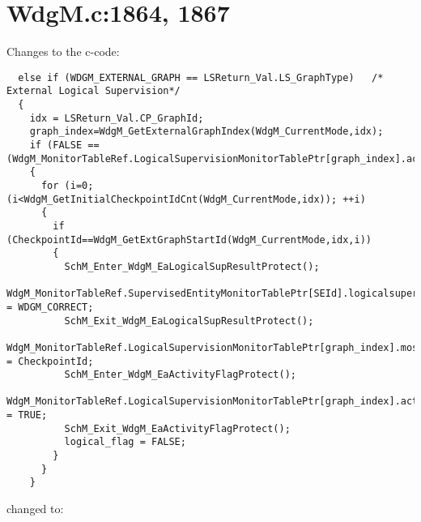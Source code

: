 \documentclass[11pt,a4paper]{article}
\begin{document}
\section{WdgM.c:1864, 1867}
\lstset{language=autosar}

\lstset{language=c}

Changes to the c-code:
\begin{lstlisting}
  else if (WDGM_EXTERNAL_GRAPH == LSReturn_Val.LS_GraphType)   /* External Logical Supervision*/
  {
    idx = LSReturn_Val.CP_GraphId;
    graph_index=WdgM_GetExternalGraphIndex(WdgM_CurrentMode,idx);
    if (FALSE == (WdgM_MonitorTableRef.LogicalSupervisionMonitorTablePtr[graph_index].activity_flag))
    {
      for (i=0; (i<WdgM_GetInitialCheckpointIdCnt(WdgM_CurrentMode,idx)); ++i)
      {
        if (CheckpointId==WdgM_GetExtGraphStartId(WdgM_CurrentMode,idx,i))
        {
          SchM_Enter_WdgM_EaLogicalSupResultProtect();
          WdgM_MonitorTableRef.SupervisedEntityMonitorTablePtr[SEId].logicalsupervision_result = WDGM_CORRECT;
          SchM_Exit_WdgM_EaLogicalSupResultProtect();
          WdgM_MonitorTableRef.LogicalSupervisionMonitorTablePtr[graph_index].most_recently_reported = CheckpointId;
          SchM_Enter_WdgM_EaActivityFlagProtect();
          WdgM_MonitorTableRef.LogicalSupervisionMonitorTablePtr[graph_index].activity_flag = TRUE;
          SchM_Exit_WdgM_EaActivityFlagProtect();
          logical_flag = FALSE;
        }
      }
    }
\end{lstlisting}
changed to:
\end{document}
